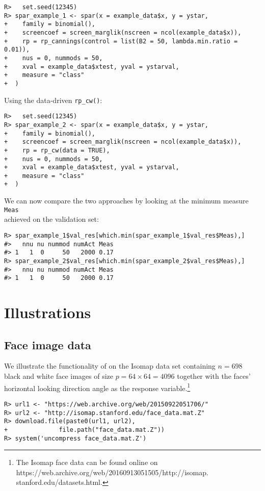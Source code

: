 \documentclass[
  article,
  nojss]{jss}
\begin{document}
\begin{verbatim}
R>   set.seed(12345) 
R> spar_example_1 <- spar(x = example_data$x, y = ystar,
+    family = binomial(),
+    screencoef = screen_marglik(nscreen = ncol(example_data$x)),
+    rp = rp_cannings(control = list(B2 = 50, lambda.min.ratio = 0.01)),
+    nus = 0, nummods = 50, 
+    xval = example_data$xtest, yval = ystarval,
+    measure = "class"
+  )
\end{verbatim}

Using the data-driven \texttt{rp\_cw()}:

\begin{verbatim}
R>   set.seed(12345)  
R> spar_example_2 <- spar(x = example_data$x, y = ystar,
+    family = binomial(),
+    screencoef = screen_marglik(nscreen = ncol(example_data$x)),
+    rp = rp_cw(data = TRUE),
+    nus = 0, nummods = 50, 
+    xval = example_data$xtest, yval = ystarval,
+    measure = "class"
+  )
\end{verbatim}

We can now compare the two approaches by looking at the minimum measure
\texttt{Meas}\\
achieved on the validation set:

\begin{verbatim}
R> spar_example_1$val_res[which.min(spar_example_1$val_res$Meas),]
#>   nnu nu nummod numAct Meas
#> 1   1  0     50   2000 0.17
R> spar_example_2$val_res[which.min(spar_example_2$val_res$Meas),]
#>   nnu nu nummod numAct Meas
#> 1   1  0     50   2000 0.17
\end{verbatim}

\section{Illustrations}\label{sec-illustrations}

\subsection{Face image data}\label{face-image-data}

We illustrate the functionality of  on the Isomap data set
containing \(n = 698\) black and white face images of size
\(p = 64 \times 64 = 4096\) together with the faces' horizontal looking
direction angle as the response variable.\footnote{
The Isomap face data can be found online on https://web.archive.org/web/20160913051505/http://isomap.
stanford.edu/datasets.html.}

\begin{verbatim}
R> url1 <- "https://web.archive.org/web/20150922051706/"
R> url2 <- "http://isomap.stanford.edu/face_data.mat.Z"
R> download.file(paste0(url1, url2),
+              file.path("face_data.mat.Z"))
R> system('uncompress face_data.mat.Z')
\end{verbatim}
\end{document}
